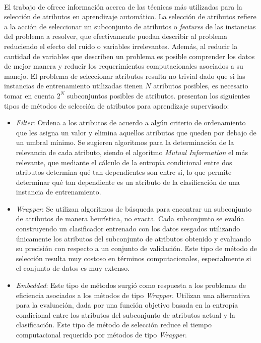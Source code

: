 \paragraph{} El trabajo de \citet{fs-survey} ofrece información acerca de las técnicas más utilizadas para la selección de atributos en aprendizaje automático.
La selección de atributos refiere a la acción de seleccionar un subconjunto de atributos o \textit{features} de las instancias del problema a resolver, que efectivamente puedan describir al problema reduciendo el efecto del ruido o variables irrelevantes.
Además, al reducir la cantidad de variables que describen un problema es posible comprender los datos de mejor manera y reducir los requerimientos computacionales asociados a su manejo.
El problema de seleccionar atributos resulta no trivial dado que si las instancias de entrenamiento utilizadas tienen $N$ atributos posibles, es necesario tomar en cuenta $2^N$ subconjuntos posibles de atributos. \citet{fs-survey} presentan los siguientes tipos de métodos de selección de atributos para aprendizaje supervisado:
\begin{itemize}
\item \textit{Filter}: Ordena a los atributos de acuerdo a algún criterio de ordenamiento que les asigna un valor y elimina aquellos atributos que queden por debajo de un umbral mínimo.
Se sugieren algoritmos para la determinación de la relevancia de cada atributo, siendo el algoritmo \textit{Mutual Information} el más relevante, que mediante el cálculo de la entropía condicional entre dos atributos determina qué tan dependientes son entre sí, lo que permite determinar qué tan dependiente es un atributo de la clasificación de una instancia de entrenamiento.
\item \textit{Wrapper}: Se utilizan algoritmos de búsqueda para encontrar un subconjunto de atributos de manera heurística, no exacta.
Cada subconjunto se evalúa construyendo un clasificador entrenado con los datos sesgados utilizando únicamente los atributos del subconjunto de atributos obtenido y evaluando su precisión con respecto a un conjunto de validación.
Este tipo de método de selección resulta muy costoso en términos computacionales, especialmente si el conjunto de datos es muy extenso.
\item \textit{Embedded}: Este tipo de métodos surgió como respuesta a los problemas de eficiencia asociados a los métodos de tipo \textit{Wrapper}.
Utilizan una alternativa para la evaluación, dada por una función objetivo basada en la entropía condicional entre los atributos del subconjunto de atributos actual y la clasificación.
Este tipo de método de selección reduce el tiempo computacional requerido por métodos de tipo \textit{Wrapper}.
\end{itemize}
